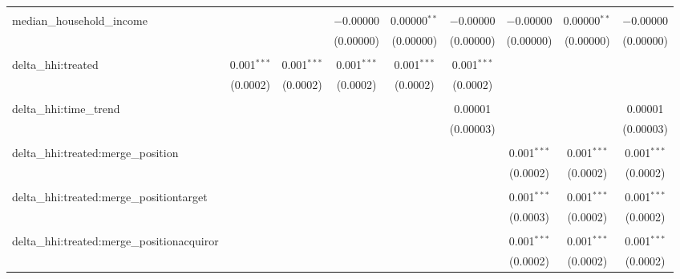 \begin{table}[H]
{\begin{tabular}{@{\extracolsep{5pt}}lcccccccc}
   & & & & & & & & \\  

  median\_household\_income &  &  & $-$0.00000 & 0.00000$^{**}$ & $-$0.00000 & $-$0.00000 & 0.00000$^{**}$ & $-$0.00000 \\  

   &  &  & (0.00000) & (0.00000) & (0.00000) & (0.00000) & (0.00000) & (0.00000) \\  

   & & & & & & & & \\  

  delta\_hhi:treated & 0.001$^{***}$ & 0.001$^{***}$ & 0.001$^{***}$ & 0.001$^{***}$ & 0.001$^{***}$ &  &  &  \\  

   & (0.0002) & (0.0002) & (0.0002) & (0.0002) & (0.0002) &  &  &  \\  

   & & & & & & & & \\  

  delta\_hhi:time\_trend &  &  &  &  & 0.00001 &  &  & 0.00001 \\  

   &  &  &  &  & (0.00003) &  &  & (0.00003) \\  

   & & & & & & & & \\  

  delta\_hhi:treated:merge\_position &  &  &  &  &  & 0.001$^{***}$ & 0.001$^{***}$ & 0.001$^{***}$ \\  

   &  &  &  &  &  & (0.0002) & (0.0002) & (0.0002) \\  

   & & & & & & & & \\  

  delta\_hhi:treated:merge\_positiontarget &  &  &  &  &  & 0.001$^{***}$ & 0.001$^{***}$ & 0.001$^{***}$ \\  

   &  &  &  &  &  & (0.0003) & (0.0002) & (0.0002) \\  

   & & & & & & & & \\  

  delta\_hhi:treated:merge\_positionacquiror &  &  &  &  &  & 0.001$^{***}$ & 0.001$^{***}$ & 0.001$^{***}$ \\  

   &  &  &  &  &  & (0.0002) & (0.0002) & (0.0002) \\  


\end{tabular}}
\end{table}

